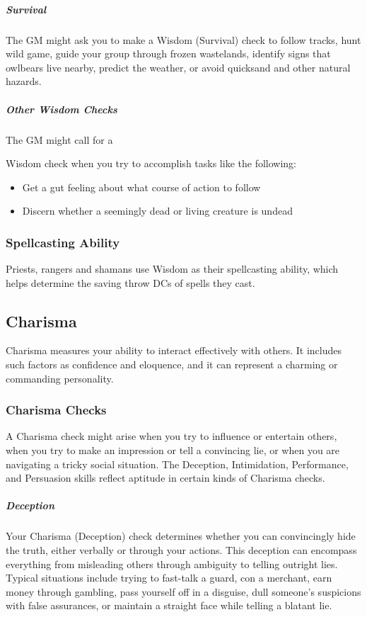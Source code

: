 \subparagraph*{Survival} The GM might ask you to make a Wisdom (Survival) check to follow tracks, hunt wild game, guide your group through frozen wastelands, identify signs that owlbears live nearby, predict the weather, or avoid quicksand and other natural hazards.

\subparagraph*{Other Wisdom Checks} The GM might call for a

Wisdom check when you try to accomplish tasks like the following:

\begin{itemize}
    \item Get a gut feeling about what course of action to follow
    \item Discern whether a seemingly dead or living creature is undead
\end{itemize}

\subsubsection{Spellcasting Ability}

Priests, rangers and shamans use Wisdom as their spellcasting ability, which helps determine the saving throw DCs of spells they cast.

\subsection{Charisma}

Charisma measures your ability to interact effectively with others. It includes such factors as confidence and eloquence, and it can represent a charming or commanding personality.

\subsubsection{Charisma Checks}

A Charisma check might arise when you try to influence or entertain others, when you try to make an impression or tell a convincing lie, or when you are navigating a tricky social situation. The Deception, Intimidation, Performance, and Persuasion skills reflect aptitude in certain kinds of Charisma checks.

\subparagraph*{Deception} Your Charisma (Deception) check determines whether you can convincingly hide the truth, either verbally or through your actions. This deception can encompass everything from misleading others through ambiguity to telling outright lies. Typical situations include trying to fast-talk a guard, con a merchant, earn money through gambling, pass yourself off in a disguise, dull someone's suspicions with false assurances, or maintain a straight face while telling a blatant lie.

